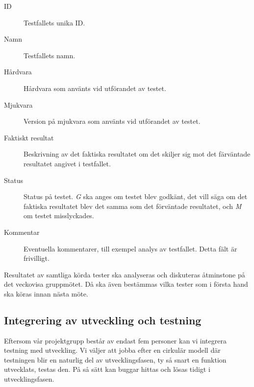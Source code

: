 \documentclass[a4paper]{article}
\begin{document}
\begin{description}
  \item [ID] Testfallets unika ID.
  \item [Namn] Testfallets namn.
  \item [Hårdvara] Hårdvara som använts vid utförandet av testet.
  \item [Mjukvara] Version på mjukvara som använts vid utförandet av testet.
  \item [Faktiskt resultat] Beskrivning av det faktiska resultatet om det skiljer sig mot det färväntade resultatet angivet i testfallet.
  \item [Status] Status på testet. \textit{G} ska anges om testet blev godkänt, det vill säga om det faktiska resultatet blev det samma som det förväntade resultatet, och \textit{M} om testet misslyckades.
  \item [Kommentar] Eventuella kommentarer, till exempel analys av testfallet. Detta fält är frivilligt.
\end{description}

Resultatet av samtliga körda tester ska analyseras och diskuteras åtminstone på det veckovisa gruppmötet. Då ska även bestämmas vilka tester som i första hand ska köras innan nästa möte.

\subsection*{Integrering av utveckling och testning}

Eftersom vår projektgrupp består av endast fem personer kan vi integrera testning med utveckling. Vi väljer att jobba efter en cirkulär modell där testningen blir en naturlig del av utvecklingsfasen, ty så snart en funktion utvecklats, testas den. På så sätt kan buggar hittas och lösas tidigt i utvecklingsfasen.
\end{document}
